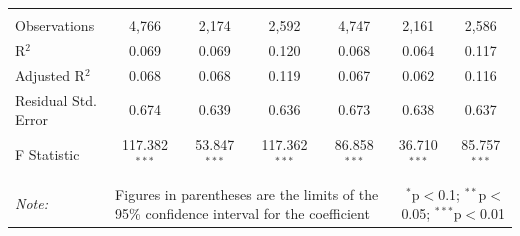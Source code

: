 \documentclass[alpha-refs]{wiley-article-01g}
\begin{document}
\begin{landscape}
\begin{table}[!htbp]
\begin{tabular}{@{\extracolsep{5pt}}lcccccc}
  & & & & & & \\ 
\hline \\[-3ex] 
Observations & 4,766 & 2,174 & 2,592 & 4,747 & 2,161 & 2,586 \\ 
R$^{2}$ & 0.069 & 0.069 & 0.120 & 0.068 & 0.064 & 0.117 \\ 
Adjusted R$^{2}$ & 0.068 & 0.068 & 0.119 & 0.067 & 0.062 & 0.116 \\ 
Residual Std. Error & 0.674 & 0.639 & 0.636 & 0.673 & 0.638 & 0.637 \\ 
F Statistic & 117.382$^{***}$ & 53.847$^{***}$ & 117.362$^{***}$ & 86.858$^{***}$ & 36.710$^{***}$ & 85.757$^{***}$ \\ 
\hline 
\hline \\[-3ex] 
\textit{Note:} &\multicolumn{4}{l}{Figures in parentheses are the limits of the 95\% confidence interval for the coefficient}  & \multicolumn{2}{r}{$^{*}$p$<$0.1; $^{**}$p$<$0.05; $^{***}$p$<$0.01} \\ 
\end{tabular} 
\end{table} 

\end{landscape}

\newpage
\end{document}
